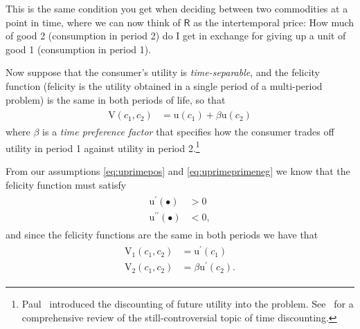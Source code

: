 \documentclass{scrartcl}
\begin{document}
  This is the same condition you get when deciding between two commodities at a point in time, where we can now think of $\mathsf{R}$ as the intertemporal price: How much of good 2 (consumption in period 2) do I get in exchange for giving up a unit of good 1 (consumption in period 1).

  Now suppose that the consumer's utility is \textit{time-separable}, and the felicity function (felicity is the utility obtained in a single period of a multi-period problem) is the same in both periods of life, so that
  \begin{equation}\begin{gathered}\begin{aligned} \mathrm{V}(\boldsymbol{\mathit{c}}_{1},\boldsymbol{\mathit{c}}_{2}) & = \mathrm{u}(\boldsymbol{\mathit{c}}_{1})+\beta \mathrm{u}(\boldsymbol{\mathit{c}}_{2})
      \end{aligned}\end{gathered}\end{equation} where $\beta$ is a \textit{time preference factor} that specifies how the consumer trades off utility in period 1 against utility in period 2.\footnote{Paul~\cite{samuelson1937note,samuelsonOLG} introduced the discounting of future utility into the problem.
    See~\cite{floDiscounting} for a comprehensive review of the still-controversial topic of time discounting.}

  From our assumptions \eqref{eq:uprimepos} and \eqref{eq:uprimeprimeneg} we know that the felicity function must satisfy
  \begin{equation}\begin{gathered}\begin{aligned} \mathrm{u}^{\prime}(\bullet) & > 0 \\ \mathrm{u}^{\prime\prime}(\bullet) & < 0,
      \end{aligned}\end{gathered}\end{equation} and since the felicity functions are the same in both periods we have that
  \begin{equation}\begin{gathered}\begin{aligned} \mathrm{V}_{1}(\boldsymbol{\mathit{c}}_{1},\boldsymbol{\mathit{c}}_{2}) & = \mathrm{u}^{\prime}(\boldsymbol{\mathit{c}}_{1}) \\ \mathrm{V}_{2}(\boldsymbol{\mathit{c}}_{1},\boldsymbol{\mathit{c}}_{2}) & = \beta \mathrm{u}^{\prime}(\boldsymbol{\mathit{c}}_{2}).
      \end{aligned}\end{gathered}\end{equation}
\end{document}

